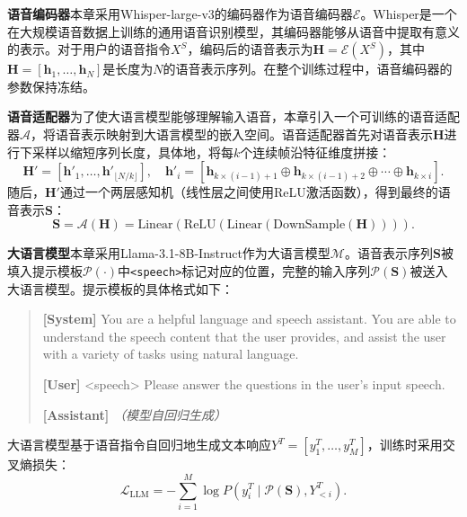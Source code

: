 \textbf{语音编码器}\quad 本章采用Whisper-large-v3\citep{whisper}的编码器作为语音编码器$\mathcal{E}$。Whisper是一个在大规模语音数据上训练的通用语音识别模型，其编码器能够从语音中提取有意义的表示。对于用户的语音指令$X^S$，编码后的语音表示为$\mathbf{H} = \mathcal{E}(X^S)$，其中$\mathbf{H}=[\mathbf{h}_1, \ldots, \mathbf{h}_N]$是长度为$N$的语音表示序列。在整个训练过程中，语音编码器的参数保持冻结。

\textbf{语音适配器}\quad 为了使大语言模型能够理解输入语音，本章引入一个可训练的语音适配器$\mathcal{A}$，将语音表示映射到大语言模型的嵌入空间。语音适配器首先对语音表示$\mathbf{H}$进行下采样以缩短序列长度，具体地，将每$k$个连续帧沿特征维度拼接：
\begin{equation}
    \mathbf{H}' = [\mathbf{h}'_1, \ldots, \mathbf{h}'_{\lfloor N/k \rfloor}], \quad \mathbf{h}'_i = [\mathbf{h}_{k \times (i-1)+1} \oplus \mathbf{h}_{k \times (i-1)+2} \oplus \cdots \oplus \mathbf{h}_{k \times i}].
\end{equation}
随后，$\mathbf{H}'$通过一个两层感知机（线性层之间使用ReLU激活函数），得到最终的语音表示$\mathbf{S}$：
\begin{equation}
    \mathbf{S} = \mathcal{A}(\mathbf{H}) = \text{Linear}(\text{ReLU}(\text{Linear}(\text{DownSample}(\mathbf{H})))).
\end{equation}

\textbf{大语言模型}\quad 本章采用Llama-3.1-8B-Instruct\citep{dubey2024llama3}作为大语言模型$\mathcal{M}$。语音表示序列$\mathbf{S}$被填入提示模板$\mathcal{P}(\cdot)$中\texttt{<speech>}标记对应的位置，完整的输入序列$\mathcal{P}(\mathbf{S})$被送入大语言模型。提示模板的具体格式如下：

\begin{quote}
\small\ttfamily
\textbf{[System]} You are a helpful language and speech assistant. You are able to understand the speech content that the user provides, and assist the user with a variety of tasks using natural language.

\textbf{[User]} <speech> Please answer the questions in the user's input speech.

\textbf{[Assistant]} \textit{（模型自回归生成）}
\end{quote}

\noindent 大语言模型基于语音指令自回归地生成文本响应$Y^T = [y^T_1, \ldots, y^T_M]$，训练时采用交叉熵损失：
\begin{equation}
    \mathcal{L}_{\text{LLM}} = -\sum_{i=1}^{M} \log P(y^T_i \mid \mathcal{P}(\mathbf{S}), Y^T_{<i}).
    \label{eq:llm_loss}
\end{equation}

